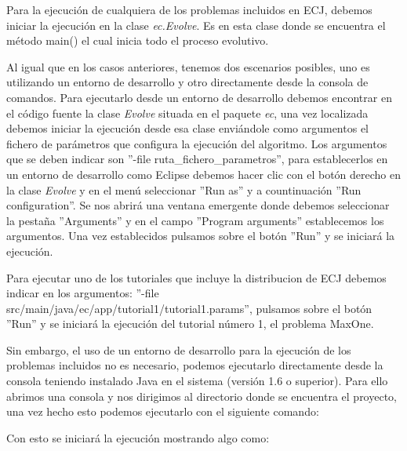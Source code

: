 Para la ejecuci\'on de cualquiera de los problemas incluidos en ECJ, debemos iniciar la ejecuci\'on en la clase \textit{ec.Evolve}. Es en esta clase donde se encuentra el m\'etodo main() el cual inicia todo el proceso evolutivo.

Al igual que en los casos anteriores, tenemos dos escenarios posibles, uno es utilizando un entorno de desarrollo y otro directamente desde la consola de comandos. Para ejecutarlo desde un entorno de desarrollo debemos encontrar en el c\'odigo fuente la clase \textit{Evolve} situada en el paquete \textit{ec}, una vez localizada debemos iniciar la ejecuci\'on desde esa clase envi\'andole como argumentos el fichero de par\'ametros que configura la ejecuci\'on del algoritmo. Los argumentos que se deben indicar son ''-file ruta\_fichero\_parametros'', para establecerlos en un entorno de desarrollo como Eclipse debemos hacer clic con el bot\'on derecho en la clase \textit{Evolve} y en el men\'u seleccionar ''Run as'' y a countinuaci\'on ''Run configuration''. Se nos abrir\'a una ventana emergente donde debemos seleccionar la pesta\~na ''Arguments'' y en el campo ''Program arguments'' establecemos los argumentos. Una vez establecidos pulsamos sobre el bot\'on ''Run'' y se iniciar\'a la ejecuci\'on.

Para ejecutar uno de los tutoriales que incluye la distribucion de ECJ debemos indicar en los argumentos: ''-file src/main/java/ec/app/tutorial1/tutorial1.params'', pulsamos sobre el bot\'on ''Run'' y se iniciar\'a la ejecuci\'on del tutorial n\'umero 1, el problema MaxOne.

Sin embargo, el uso de un entorno de desarrollo para la ejecuci\'on de los problemas incluidos no es necesario, podemos ejecutarlo directamente desde la consola teniendo instalado Java en el sistema (versi\'on 1.6 o superior). Para ello abrimos una consola y nos dirigimos al directorio donde se encuentra el proyecto, una vez hecho esto podemos ejecutarlo con el siguiente comando:


Con esto se iniciar\'a la ejecuci\'on mostrando algo como:

